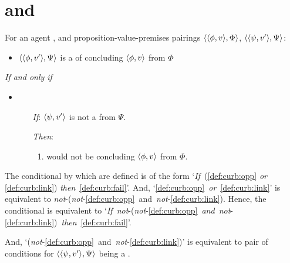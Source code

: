 \section{ and }

\begin{note}
  \begin{proposition}
        For an agent \vAgent{}, and proposition-value-premises pairings \(\langle \langle \phi, v \rangle, \Phi \rangle\), \(\langle \langle \psi, v' \rangle, \Psi \rangle\):

    \begin{itemize}
    \item
      \(\langle \langle \phi, v' \rangle, \Psi \rangle\) is a \emph{\curb{}} of concluding \(\langle \phi, v \rangle\) from \(\Phi\)
    \end{itemize}

    \emph{If and only if}

    \begin{itemize}
    \item
        \begin{enumerate}
        \item[\emph{If}:]
          \(\langle \psi, v' \rangle\) is not a \fc{} from \(\Psi\).
        \item[\emph{Then}:]
          \begin{enumerate}[label=\alph*., ref=(\alph*), resume]
          \item
            \label{def:curb:fail}
            \vAgent{} would not be concluding \(\langle \phi, v \rangle\) from \(\Phi\).
          \end{enumerate}
      \end{enumerate}
    \end{itemize}
    \begin{argument}
      The conditional by which  are defined is of the form `\emph{If}~(\ref{def:curb:opp} \emph{or} \ref{def:curb:link}) \emph{then}~\ref{def:curb:fail}'.
      And, `\ref{def:curb:opp}~\emph{or}~\ref{def:curb:link}' is equivalent to \emph{not}-(\emph{not}-\ref{def:curb:opp}~and~\emph{not}-\ref{def:curb:link}).
      Hence, the conditional is equivalent to `\emph{If}~\emph{not}-(\emph{not}-\ref{def:curb:opp}~\emph{and}~\emph{not}-\ref{def:curb:link})~\emph{then}~\ref{def:curb:fail}'.

    And, `(\emph{not}-\ref{def:curb:opp}~and~\emph{not}-\ref{def:curb:link})' is equivalent to pair of conditions for \(\langle \langle \psi, v' \rangle, \Psi \rangle\) being a \fc{}.
    \end{argument}
  \end{proposition}
\end{note}

